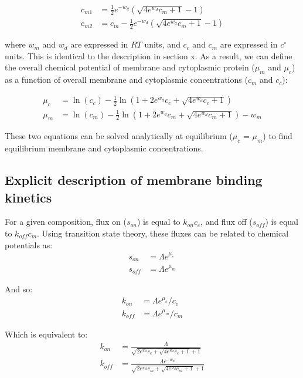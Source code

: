\documentclass[12pt]{"report"}
\begin{document}
\begin{align}
c_{m1} &= \frac{1}{2} e^{-w_d} \left(\sqrt{4e^{w_d} c_m + 1} - 1\right)\\
c_{m2} &= c_m - \frac{1}{2}e^{-w_d}\left(\sqrt{4e^{w_d} c_m + 1} - 1\right)
\end{align}

where $w_m$ and $w_d$ are expressed in $RT$ units, and $c_c$ and $c_m$ are expressed in $c^{\circ}$ units. This is identical to the description in section x. As a result, we can define the overall chemical potential of membrane and cytoplasmic protein ($\mu_m$ and $\mu_c$) as a function of overall membrane and cytoplasmic concentrations ($c_m$ and $c_c$):

\begin{align}
\mu_c &= \ln(c_c) - \frac{1}{2}\ln\left(1 + 2e^{w_d} c_c + \sqrt{4e^{w_d} c_c+ 1}\right)\\
\mu_m &= \ln(c_m) - \frac{1}{2}\ln\left(1 + 2e^{w_d} c_m + \sqrt{4e^{w_d} c_m + 1}\right) - w_m
\end{align}

These two equations can be solved analytically at equilibrium ($\mu_c$ = $\mu_m$) to find equilibrium membrane and cytoplasmic concentrations.


\subsection{Explicit description of membrane binding kinetics} 


\begin{center}
\end{center}

For a given composition, flux on ($s_{on}$) is equal to $k_{on} c_c$, and flux off ($s_{off}$) is equal to $k_{off} c_m$. Using transition state theory, these fluxes can be related to chemical potentials as:
\begin{align}
s_{on} &= \Lambda e^{\mu_c}\\
s_{off} &= \Lambda e^{\mu_m}
\end{align}

And so:
\begin{align}
k_{on} &= \Lambda e^{\mu_c} / c_c \\
k_{off} &= \Lambda e^{\mu_m} / c_m
\end{align}

Which is equivalent to:
\begin{align}
k_{on} &= \frac{\Lambda}{\sqrt{2 e^{w_d} c_c + \sqrt{4 e^{w_d} c_c + 1} + 1}}\\
k_{off} &= \frac{\Lambda e^{-w_m}}{\sqrt{2 e^{w_d} c_m + \sqrt{4 e^{w_d} c_m + 1} + 1}}\\
\end{align}
\end{document}
